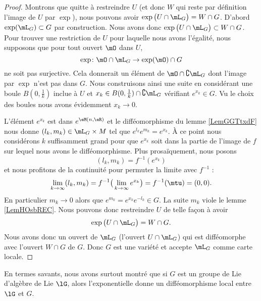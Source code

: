 \begin{proof}
    Montrons que quitte à restreindre \( U\) (et donc \( W\) qui reste par définition l'image de \( U\) par \( \exp\)), nous pouvons avoir \( \exp\big( U\cap\mL_G \big)=W\cap G\). D'abord \( \exp(\mL_G)\subset G\) par construction. Nous avons donc \( \exp\big( U\cap\mL_G \big)\subset W\cap G\). Pour trouver une restriction de \( U\) pour laquelle nous avons l'égalité, nous supposons que pour tout ouvert \( \mO\) dans \( U\), 
    \begin{equation}
        \exp\colon \mO\cap\mL_G\to \exp(\mO)\cap G
    \end{equation}
    ne soit pas surjective. Cela donnerait un élément de \( \mO\cap\complement\mL_G\) dont l'image par \( \exp\) n'est pas dans \( G\). Nous construisons ainsi une suite en considérant une boule \( B(0,\frac{1}{ k })\) inclue à \( U\) et \( x_k\in B(0,\frac{1}{ k })\cap\complement\mL_G\) vérifiant \(  e^{x_k}\in G\). Vu le choix des boules nous avons évidemment \( x_k\to 0\).

    L'élément \(  e^{x_k}\) est dans \(  e^{\eM(n,\eR)}\) et le difféomorphisme du lemme \ref{LemGGTtxdF} nous donne \( (l_k,m_k)\in \mL_G\times M\) tel que \(  e^{l_k} e^{m_k}= e^{x_k}\). À ce point nous considérons \( k\) suffisamment grand pour que \(  e^{x_k}\) soit dans la partie de l'image de \( f\) sur lequel nous avons le difféomorphisme. Plus prosaïquement, nous posons
    \begin{equation}
        (l_k,m_k)=f^{-1}( e^{x_k})
    \end{equation}
    et nous profitons de la continuité pour permuter la limite avec \( f^{-1}\) :
    \begin{equation}
        \lim_{k\to \infty} (l_k,m_k)=f^{-1}\big( \lim_{k\to \infty}  e^{x_k} \big)=f^{-1}(\mtu)=(0,0).
    \end{equation}
    En particulier \( m_k\to 0\) alors que \(  e^{m_k}= e^{x_k} e^{-l_k}\in G\). La suite \( m_k\) viole le lemme \ref{LemHOsbREC}. Nous pouvons donc restreindre \( U\) de telle façon à avoir
    \begin{equation}
        \exp\big( U\cap\mL_G \big)=W\cap G.
    \end{equation}
    Nous avons donc un ouvert de \( \mL_G\) (l'ouvert \( U\cap\mL_G\)) qui est difféomorphe avec l'ouvert \( W\cap G\) de \( G\). Donc \( G\) est une variété et accepte \( \mL_G\) comme carte locale.

\end{proof}

\begin{remark}
    En termes savants, nous avons surtout montré que si \( G\) est un groupe de Lie d'algèbre de Lie \( \lG\), alors l'exponentielle donne un difféomorphisme local entre \( \lG\) et \( G\).
\end{remark}

